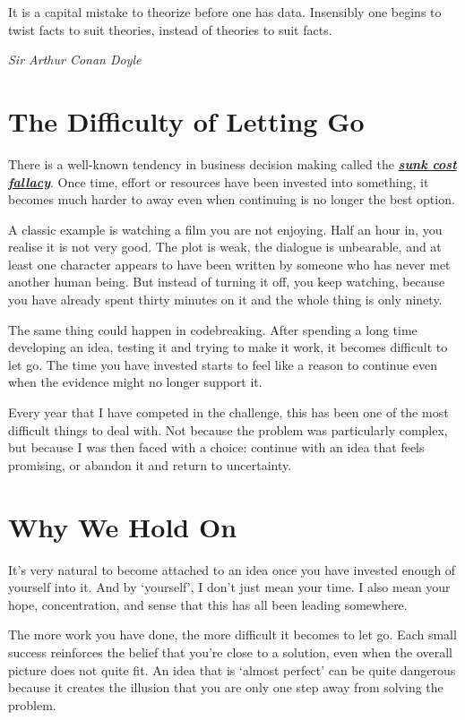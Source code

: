 \epigraph{It is a capital mistake to theorize before one has data. Insensibly one begins to twist facts to suit theories, instead of theories to suit facts.}
{\textit{Sir Arthur Conan Doyle}}

\section{The Difficulty of Letting Go}

There is a well-known tendency in business decision making called the \textbf{\textit{\href{https://en.wikipedia.org/wiki/Sunk_cost}{sunk cost fallacy}}}. Once time, effort or resources have been invested into something, it becomes much harder to away even when continuing is no longer the best option. 

A classic example is watching a film you are not enjoying. Half an hour in, you realise it is not very good. The plot is weak, the dialogue is unbearable, and at least one character appears to have been written by someone who has never met another human being. But instead of turning it off, you keep watching, because you have already spent thirty minutes on it and the whole thing is only ninety.

The same thing could happen in codebreaking. After spending a long time developing an idea, testing it and trying to make it work, it becomes difficult to let go. The time you have invested starts to feel like a reason to continue even when the evidence might no longer support it. 

Every year that I have competed in the challenge, this has been one of the most difficult things to deal with. Not because the problem was particularly complex, but because I was then faced with a choice: continue with an idea that feels promising, or abandon it and return to uncertainty.

\section{Why We Hold On}

It's very natural to become attached to an idea once you have invested enough of yourself into it. And by `yourself', I don't just mean your time. I also mean your hope, concentration, and sense that this has all been leading somewhere. 

The more work you have done, the more difficult it becomes to let go. Each small success reinforces the belief that you're close to a solution, even when the overall picture does not quite fit. An idea that is `almost perfect' can be quite dangerous because it creates the illusion that you are only one step away from solving the problem. 


